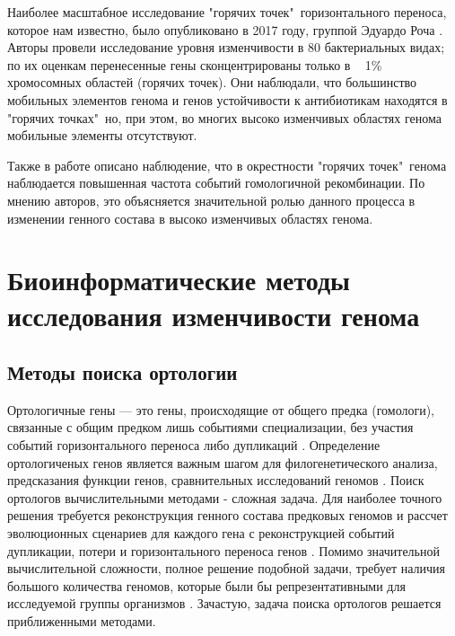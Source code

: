 Наиболее масштабное исследование "горячих точек"\ горизонтального переноса, которое нам известно, было опубликовано в 2017 году, группой Эдуардо Роча \cite{oliveira2017chromosomal}. Авторы провели исследование уровня изменчивости в 80 бактериальных видах; по их оценкам перенесенные гены сконцентрированы только в ~ 1\% хромосомных областей (горячих точек). Они наблюдали, что большинство мобильных элементов генома и генов устойчивости к антибиотикам находятся в "горячих точках"\, но, при этом, во многих высоко изменчивых областях генома мобильные элементы отсутствуют. 

Также в работе \cite{oliveira2017chromosomal} описано наблюдение, что в окрестности "горячих точек"\ генома наблюдается повышенная частота событий гомологичной рекомбинации. По мнению авторов, это объясняется значительной ролью данного процесса в изменении генного состава в высоко изменчивых областях генома.

\section{Биоинформатические методы исследования изменчивости генома}
\subsection{Методы поиска ортологии}
Ортологичные гены --- это гены, происходящие от общего предка (гомологи), связанные с общим предком лишь событиями специализации, без участия событий горизонтального переноса либо дупликаций \cite{fitch1970distinguishing}. Определение ортологиченых генов является важным шагом для филогенетического анализа, предсказания функции генов, сравнительных исследований геномов \cite{glover2019advances}. Поиск ортологов вычислительными методами - сложная задача. Для наиболее точного решения требуется реконструкция генного состава предковых геномов и рассчет эволюционных сценариев для каждого гена с реконструкцией событий дупликации, потери и горизонтального переноса генов \cite{glover2019advances}. Помимо значительной вычислительной сложности, полное решение подобной задачи, требует наличия большого количества геномов, которые были бы репрезентативными для исследуемой группы организмов \cite{theissen2002orthology}. Зачастую, задача поиска ортологов решается приближенными методами. 

